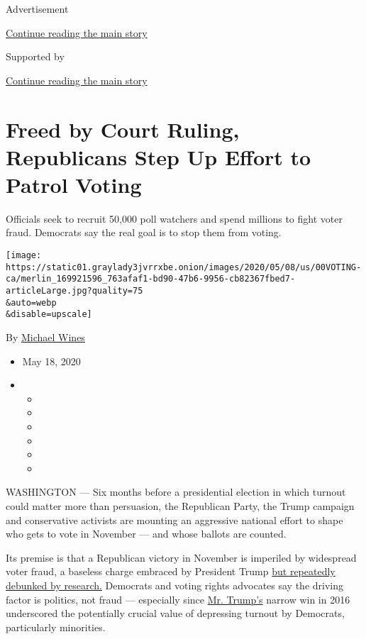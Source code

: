 Advertisement

\protect\hyperlink{after-top}{Continue reading the main story}

Supported by

\protect\hyperlink{after-sponsor}{Continue reading the main story}

\hypertarget{freed-by-court-ruling-republicans-step-up-effort-to-patrol-voting}{%
\section{Freed by Court Ruling, Republicans Step Up Effort to Patrol
Voting}\label{freed-by-court-ruling-republicans-step-up-effort-to-patrol-voting}}

Officials seek to recruit 50,000 poll watchers and spend millions to
fight voter fraud. Democrats say the real goal is to stop them from
voting.

\texttt{[image: https://static01.graylady3jvrrxbe.onion/images/2020/05/08/us/00VOTING-ca/merlin\_169921596\_763afaf1-bd90-47b6-9956-cb82367fbed7-articleLarge.jpg?quality=75\\\&auto=webp\\\&disable=upscale]}

By \href{https://www.nytimes3xbfgragh.onion/by/michael-wines}{Michael
Wines}

\begin{itemize}
\item
  May 18, 2020
\item
  \begin{itemize}
  \item
  \item
  \item
  \item
  \item
  \item
  \end{itemize}
\end{itemize}

WASHINGTON --- Six months before a presidential election in which
turnout could matter more than persuasion, the Republican Party, the
Trump campaign and conservative activists are mounting an aggressive
national effort to shape who gets to vote in November --- and whose
ballots are counted.

Its premise is that a Republican victory in November is imperiled by
widespread voter fraud, a baseless charge embraced by President Trump
\href{https://www.brennancenter.org/sites/default/files/analysis/Briefing_Memo_Debunking_Voter_Fraud_Myth.pdf}{but
repeatedly debunked by research.} Democrats and voting rights advocates
say the driving factor is politics, not fraud --- especially since
\href{https://www.nytimes3xbfgragh.onion/2020/06/27/us/politics/trump-biden-protests-polling.html}{Mr.
Trump's} narrow win in 2016 underscored the potentially crucial value of
depressing turnout by Democrats, particularly minorities.

